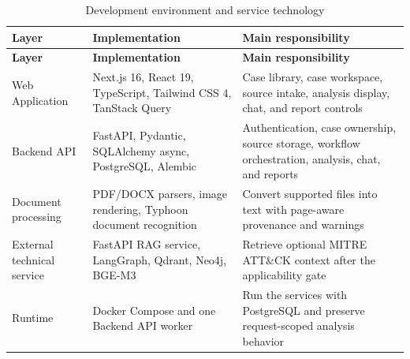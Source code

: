 \begin{longtable}{@{}>{\raggedright\arraybackslash}p{} >{\raggedright\arraybackslash}p{} >{\raggedright\arraybackslash}p{}@{}}
\caption{Development environment and service technology}\label{tab:4-1}\\
\toprule
\textbf{Layer} & \textbf{Implementation} & \textbf{Main responsibility} \\
\midrule
\endfirsthead
\textbf{Layer} & \textbf{Implementation} & \textbf{Main responsibility} \\
\midrule
\endhead
Web Application & Next.js 16, React 19, TypeScript, Tailwind CSS 4, TanStack Query & Case library, case workspace, source intake, analysis display, chat, and report controls \\
Backend API & FastAPI, Pydantic, SQLAlchemy async, PostgreSQL, Alembic & Authentication, case ownership, source storage, workflow orchestration, analysis, chat, and reports \\
Document processing & PDF/DOCX parsers, image rendering, Typhoon document recognition & Convert supported files into text with page-aware provenance and warnings \\
External technical service & FastAPI RAG service, LangGraph, Qdrant, Neo4j, BGE-M3 & Retrieve optional MITRE ATT\&CK context after the applicability gate \\
Runtime & Docker Compose and one Backend API worker & Run the services with PostgreSQL and preserve request-scoped analysis behavior \\
\bottomrule
\end{longtable}

